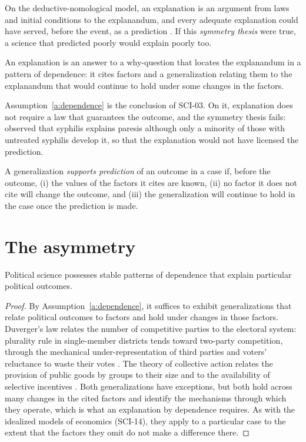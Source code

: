 \documentclass{situationist-preprint}
\begin{document}
On the deductive-nomological model, an explanation is an argument from laws and initial conditions to the explanandum, and every adequate explanation could have served, before the event, as a prediction \citep{HempelOppenheim1948}. If this \emph{symmetry thesis} were true, a science that predicted poorly would explain poorly too.

\begin{assumption}\label{a:dependence}
An explanation is an answer to a why-question that locates the explanandum in a pattern of dependence: it cites factors and a generalization relating them to the explanandum that would continue to hold under some changes in the factors.
\end{assumption}

Assumption~\ref{a:dependence} is the conclusion of SCI-03. On it, explanation does not require a law that guarantees the outcome, and the symmetry thesis fails: \citet{Scriven1959} observed that syphilis explains paresis although only a minority of those with untreated syphilis develop it, so that the explanation would not have licensed the prediction.

\begin{definition}\label{d:prediction}
A generalization \emph{supports prediction} of an outcome in a case if, before the outcome, (i) the values of the factors it cites are known, (ii) no factor it does not cite will change the outcome, and (iii) the generalization will continue to hold in the case once the prediction is made.
\end{definition}

\section{The asymmetry}

\begin{proposition}\label{p:explains}
Political science possesses stable patterns of dependence that explain particular political outcomes.
\end{proposition}

\begin{proof}
By Assumption~\ref{a:dependence}, it suffices to exhibit generalizations that relate political outcomes to factors and hold under changes in those factors. Duverger's law relates the number of competitive parties to the electoral system: plurality rule in single-member districts tends toward two-party competition, through the mechanical under-representation of third parties and voters' reluctance to waste their votes \citep{Duverger1954}. The theory of collective action relates the provision of public goods by groups to their size and to the availability of selective incentives \citep{Olson1965}. Both generalizations have exceptions, but both hold across many changes in the cited factors and identify the mechanisms through which they operate, which is what an explanation by dependence requires. As with the idealized models of economics (SCI-14), they apply to a particular case to the extent that the factors they omit do not make a difference there.
\end{proof}
\end{document}
